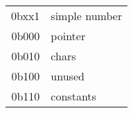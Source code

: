 


  \begin{tabular}{rl}
    \textsf{0bxx1} & simple number    \\
    \textsf{0b000} & pointer \\
    \textsf{0b010} & chars \\
    \textsf{0b100} & unused \\
    \textsf{0b110} & constants \\
  \end{tabular}

